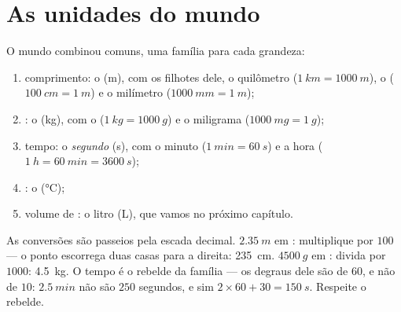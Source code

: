 \section{As unidades do mundo}

\begin{definition}\label{def:g6:measurement-in-science:units}
O mundo combinou  comuns, uma família para cada grandeza:
\begin{enumerate}
  \item comprimento: o \emph{} (\unit{m}), com os filhotes
        dele, o quilômetro ($\qty{1}{km} = \qty{1000}{m}$), o
         ($\qty{100}{cm} = \qty{1}{m}$) e o milímetro
        ($\qty{1000}{mm} = \qty{1}{m}$);
  \item {}: o \emph{} (\unit{kg}), com o 
        ($\qty{1}{kg} = \qty{1000}{g}$) e o miligrama
        ($\qty{1000}{mg} = \qty{1}{g}$);
  \item tempo: o \emph{segundo} (\unit{s}), com o minuto
        ($\qty{1}{min} = \qty{60}{s}$) e a hora
        ($\qty{1}{h} = \qty{60}{min} = \qty{3600}{s}$);
  \item {}: o  (\unit{\celsius});
  \item volume de : o litro (\unit{L}), que vamos  no
        próximo capítulo.
\end{enumerate}
\end{definition}

\begin{example}\label{ex:g6:measurement-in-science:convert}
As conversões são passeios pela escada decimal. $\qty{2.35}{m}$ em
: multiplique por $100$ --- o ponto escorrega duas casas
para a direita: \qty{235}{cm}. $\qty{4500}{g}$ em : divida
por $1000$: \qty{4.5}{kg}. O tempo é o rebelde da família --- os
degraus dele são de $60$, e não de $10$: $\qty{2.5}{min}$ não são
$250$ segundos, e sim $2 \times 60 + 30 = \qty{150}{s}$. Respeite o
rebelde.
\end{example}

